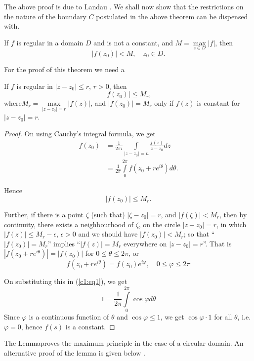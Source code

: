 \begin{remark*}
The above proof is due to Landau \cite[p.105]{key12}. We shall now show that
the restrictions on the nature of the boundary $C$ postulated in the
above theorem can be dispensed with.
\end{remark*}

\begin{thm}\label{chap1:thm2}
If $f$ is regular in a domain $D$ and is not a constant, and $M =
\max\limits_{z\in D} |f|$, then 
$$
|f(z_0)| < M, \quad z_0 \in D.
$$

For the proof of this theorem we need a 
\end{thm}

\begin{lemma*}
If $f$ is regular in $|z-z_0| \leq r$, $r>0$, then 
$$
|f(z_0)| \leq M_r, 
$$
where\pageoriginale $M_r = \max\limits_{|z-z_0| = r} |f(z)|$, and
$|f(z_0)| = M_r$ only if $f(z)$ is constant for $|z-z_0| =r$.
\end{lemma*}

\begin{proof}
On using Cauchy's integral formula, we get
\begin{align*}
f(z_0) & = \frac{1}{2 \pi i} \int\limits_{|z-z_0| = n}
\frac{f(z)}{z-z_0} dz\\
& = \frac{1}{2\pi} \int\limits^{2\pi}_0 f(z_0 + r e^{i\theta}) d
\theta. \tag{1}\label{c1:eq1}
\end{align*}

Hence
$$
|f(z_0)| \leq M_r.
$$

Further, if there is a point $\zeta$ (such that) $|\zeta - z_0| = r$,
and $|f(\zeta)| < M_r$, then by continuity, there exists a
neighbourhood of $\zeta$, on the circle $|z-z_0|=r$, in which
$|f(z)| \leq M_r - \epsilon$, $\epsilon >0$ and we should have
$|f(z_0)| < M_r$; so that ``$|f(z_0)| = M_r$'' implies ``$|f(z)| =
M_r$ everywhere on $|z-z_0| =r$''. That is $|f(z_0 + r e^{i\theta})| =
|f(z_0)|$ for $0 \leq \theta \leq 2 \pi$, or
$$
f(z_0 + re^{i\theta}) = f(z_0) e^{i\varphi} , \quad 0 \leq \varphi
\leq 2 \pi
$$

On substituting this in (\ref{c1:eq1}), we get
$$
1 = \frac{1}{2\pi} \int\limits^{2\pi}_0 \cos \varphi d \theta
$$
Since $\varphi$ is a continuous function of $\theta$ and $\cos
\varphi \leq 1$, we get $\cos \varphi \cdot 1$ for all $\theta$,
i.e. $\varphi =0$, hence $f(s)$ is a constant.
\end{proof}

\begin{remarks*}
The Lemma\pageoriginale proves the maximum principle in the case of a
circular domain. An alternative proof of the lemma is given below \cite[Bd 1, p.117]{key7}.
\end{remarks*}

